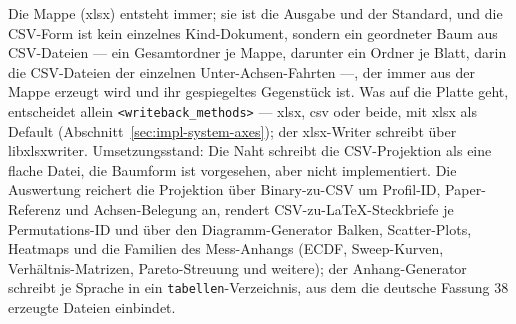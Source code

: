 \begin{nurkurz}
Die Mappe (xlsx) entsteht immer; sie ist die Ausgabe und der Standard, und die CSV-Form ist kein
einzelnes Kind-Dokument, sondern ein
geordneter Baum aus CSV-Dateien --- ein Gesamtordner je Mappe, darunter ein Ordner je Blatt, darin die
CSV-Dateien der einzelnen Unter-Achsen-Fahrten ---, der immer aus der Mappe erzeugt wird und ihr
gespiegeltes Gegenstück ist. Was auf die Platte geht, entscheidet allein
\texttt{<writeback\_methods>} --- xlsx, csv oder beide, mit xlsx als Default
(Abschnitt~\ref{sec:impl-system-axes}); der xlsx-Writer schreibt über libxlsxwriter. Umsetzungsstand: Die
Naht schreibt die CSV-Projektion als eine flache Datei, die Baumform ist vorgesehen, aber nicht
implementiert. Die Auswertung reichert die Projektion über Binary-zu-CSV um Profil-ID, Paper-Referenz und
Achsen-Belegung an, rendert CSV-zu-LaTeX-Steckbriefe je Permutations-ID und über den Diagramm-Generator
Balken, Scatter-Plots, Heatmaps und die Familien des Mess-Anhangs (ECDF, Sweep-Kurven, Verhältnis-Matrizen,
Pareto-Streuung und weitere); der Anhang-Generator schreibt je Sprache in
ein \texttt{tabellen}-Verzeichnis, aus dem die deutsche Fassung 38 erzeugte Dateien einbindet.
\end{nurkurz}

